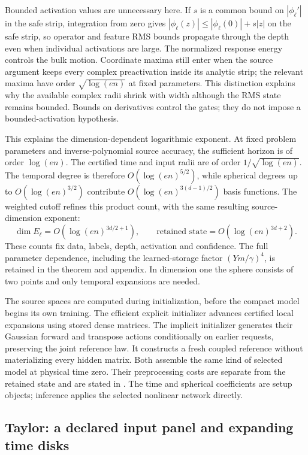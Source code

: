 Bounded activation values are unnecessary here. If $s$ is a common bound
on $|\phi_\ell'|$ in the safe strip, integration from zero gives
$|\phi_\ell(z)|\le|\phi_\ell(0)|+s|z|$ on the safe strip, so operator
and feature RMS bounds propagate through the depth even when individual
activations are large. The normalized response energy controls the bulk
motion. Coordinate maxima still enter when the source argument keeps every
complex preactivation inside its analytic strip; the relevant maxima have
order $\sqrt{\log(en)}$ at fixed parameters. This distinction explains why
the available complex radii shrink with width although the RMS state remains
bounded. Bounds on derivatives control the gates; they do not impose a
bounded-activation hypothesis.

This explains the dimension-dependent logarithmic exponent. At fixed
problem parameters and inverse-polynomial source accuracy, the sufficient
horizon is of order $\log(en)$. The certified time and input radii are of
order $1/\sqrt{\log(en)}$. The temporal degree is therefore
$O(\log(en)^{5/2})$, while spherical degrees up to
$O(\log(en)^{3/2})$ contribute
$O(\log(en)^{3(d-1)/2})$ basis functions. The weighted cutoff refines
this product count, with the same resulting source-dimension exponent:
\[
 \dim E_\ell=O(\log(en)^{3d/2+1}),\qquad
 \text{retained state}=O(\log(en)^{3d+2}).
\]
These counts fix data, labels, depth, activation and confidence. The full
parameter dependence, including the learned-storage factor
$(Ym/\gamma)^4$, is retained in the theorem and appendix. In dimension
one the sphere consists of two points and only temporal expansions are
needed.

The source spaces are computed during initialization, before the compact
model begins its own training. The efficient explicit initializer advances
certified local expansions using stored dense matrices. The implicit
initializer generates their Gaussian forward and transpose actions
conditionally on earlier requests, preserving the joint reference law.
It constructs a fresh coupled reference without materializing every hidden
matrix. Both assemble the same kind of selected model at physical time
zero. Their preprocessing costs are separate from the retained state and
are stated in . The time and spherical coefficients are
setup objects; inference applies the selected nonlinear network directly.

\subsection{Taylor: a declared input panel and expanding time disks}
\label{sec:taylor-method}
\label{sec:panel-method}

